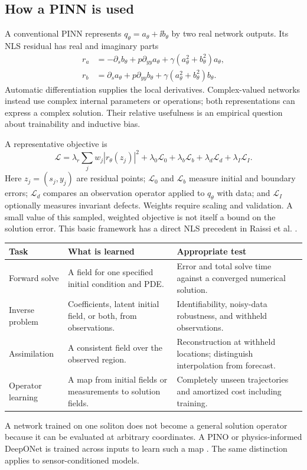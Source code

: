 \subsection{How a PINN is used}
A conventional PINN represents $q_\theta=a_\theta+\ii b_\theta$ by two real
network outputs. Its NLS residual has real and imaginary parts
\begin{align*}
 r_a&=-\partial_s b_\theta+p\partial_{yy}a_\theta
          +\gamma(a_\theta^2+b_\theta^2)a_\theta,\\
 r_b&=\partial_s a_\theta+p\partial_{yy}b_\theta
          +\gamma(a_\theta^2+b_\theta^2)b_\theta.
\end{align*}
Automatic differentiation supplies the local derivatives. Complex-valued
networks instead use complex internal parameters or operations; both
representations can express a complex solution. Their relative usefulness
is an empirical question about trainability and inductive bias.

A representative objective is
\begin{equation}
 \mathcal L=\lambda_r\sum_j w_j|r_\theta(z_j)|^2
  +\lambda_0\mathcal L_0+\lambda_b\mathcal L_b
  +\lambda_d\mathcal L_d+\lambda_I\mathcal L_I.
 \label{eq:loss}
\end{equation}
Here $z_j=(s_j,y_j)$ are residual points; $\mathcal L_0$ and
$\mathcal L_b$ measure initial and boundary errors;
$\mathcal L_d$ compares an observation operator applied to $q_\theta$
with data; and $\mathcal L_I$ optionally measures invariant defects.
Weights require scaling and validation. A small value of this sampled,
weighted objective is not itself a bound on the solution error. This basic
framework has a direct NLS precedent in Raissi et al. \cite{raissi}.

\begin{longtable}{@{}P{0.17\textwidth}P{0.35\textwidth}P{0.40\textwidth}@{}}
\toprule
Task & What is learned & Appropriate test \\
\midrule
Forward solve & A field for one specified initial condition and PDE. &
Error and total solve time against a converged numerical solution. \\
Inverse problem & Coefficients, latent initial field, or both, from observations. &
Identifiability, noisy-data robustness, and withheld observations. \\
Assimilation & A consistent field over the observed region. &
Reconstruction at withheld locations; distinguish interpolation from forecast. \\
Operator learning & A map from initial fields or measurements to solution fields. &
Completely unseen trajectories and amortized cost including training. \\
\bottomrule
\end{longtable}
A network trained on one soliton does not become a general solution operator
because it can be evaluated at arbitrary coordinates. A PINO or
physics-informed DeepONet is trained across inputs to learn such a map
\cite{pino}. The same distinction applies to sensor-conditioned models.

